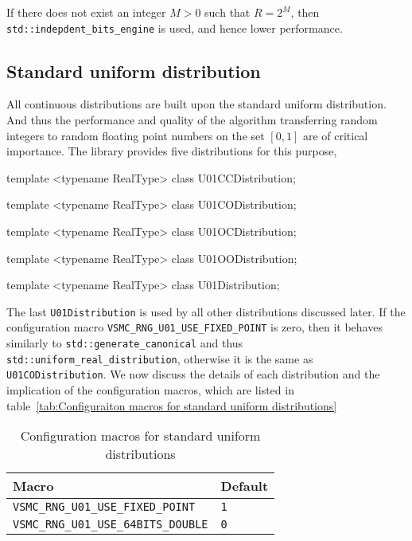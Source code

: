 If there does not exist an integer $M > 0$ such that $R = 2^M$, then
\verb|std::indepdent_bits_engine| is used, and hence lower performance.

\subsection{Standard uniform distribution}
\label{sub:Standard uniform distribution}

All continuous distributions are built upon the standard uniform distribution.
And thus the performance and quality of the algorithm transferring random
integers to random floating point numbers on the set $[0, 1]$ are of critical
importance. The library provides five distributions for this purpose,
\begin{cppcode}
  template <typename RealType>
  class U01CCDistribution;

  template <typename RealType>
  class U01CODistribution;

  template <typename RealType>
  class U01OCDistribution;

  template <typename RealType>
  class U01OODistribution;

  template <typename RealType>
  class U01Distribution;
\end{cppcode}
The last \verb|U01Distribution| is used by all other distributions discussed
later. If the configuration macro \verb|VSMC_RNG_U01_USE_FIXED_POINT| is zero,
then it behaves similarly to \verb|std::generate_canonical| and thus
\verb|std::uniform_real_distribution|, otherwise it is the same as
\verb|U01CODistribution|. We now discuss the details of each distribution and
the implication of the configuration macros, which are listed in
table~\ref{tab:Configuraiton macros for standard uniform distributions}

\begin{table}
  \begin{tabularx}{\textwidth}{XX}
    \toprule
    Macro & Default \\
    \midrule
    \verb|VSMC_RNG_U01_USE_FIXED_POINT|    & \verb|1|  \\
    \verb|VSMC_RNG_U01_USE_64BITS_DOUBLE|  & \verb|0|  \\
    \bottomrule
  \end{tabularx}
  \caption{Configuration macros for standard uniform distributions}
  \label{tab:Configuration macros for standard uniform distributions}
\end{table}

